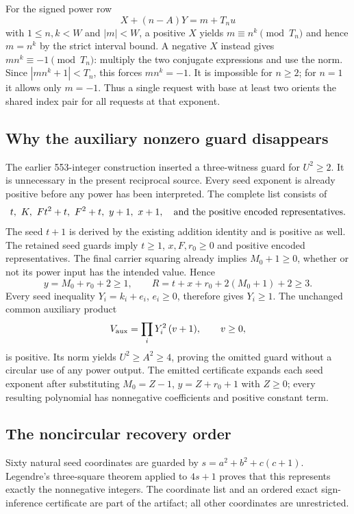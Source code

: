 For the signed power row
\[
 X+(n-A)Y=m+T_n u
\]
with $1\le n,k<W$ and $|m|<W$, a positive $X$ yields
$m\equiv n^k\pmod {T_n}$ and hence $m=n^k$ by the strict interval bound.
A negative $X$ instead gives $mn^k\equiv-1\pmod {T_n}$: multiply the two
conjugate expressions and use the norm.  Since
$|mn^k+1|<T_n$, this forces $mn^k=-1$.  It is impossible for $n\ge2$;
for $n=1$ it allows only $m=-1$.  Thus a single request with base at least
two orients the shared index pair for all requests at that exponent.

\subsection{Why the auxiliary nonzero guard disappears}

The earlier 553-integer construction inserted a three-witness guard for
$U^2\ge2$.  It is unnecessary in the present reciprocal source.
Every seed exponent is already positive before any power has been
interpreted.  The complete list consists of
\[
 t,\ K,\ Ft^2+t,\ F^2+t,\ y+1,\ x+1,
 \quad\hbox{and the positive encoded representatives.}
\]
The seed $t+1$ is derived by the existing addition identity and is positive
as well.  The retained seed guards imply $t\ge1$, $x,F,r_0\ge0$ and
positive encoded representatives.  The final carrier squaring already
implies $M_0+1\ge0$, whether or not its power input has the intended value.
Hence
\[
 y=M_0+r_0+2\ge1,\qquad
 R=t+x+r_0+2(M_0+1)+2\ge3.
\]
Every seed inequality $Y_i=k_i+e_i$, $e_i\ge0$, therefore gives $Y_i\ge1$.
The unchanged common auxiliary product
\[
 V_{\rm aux}=\prod_iY_i^2\,(v+1),\qquad v\ge0,
\]
is positive.  Its norm yields $U^2\ge A^2\ge4$, proving the omitted
guard without a circular use of any power output.  The emitted certificate
expands each seed exponent after substituting
$M_0=Z-1$, $y=Z+r_0+1$ with $Z\ge0$; every resulting polynomial has
nonnegative coefficients and positive constant term.

\subsection{The noncircular recovery order}

Sixty natural seed coordinates are guarded by
$s=a^2+b^2+c(c+1)$.  Legendre's three-square theorem applied to $4s+1$
proves that this represents exactly the nonnegative integers.  The
coordinate list and an ordered exact sign-inference certificate are part
of the artifact; all other coordinates are unrestricted.


